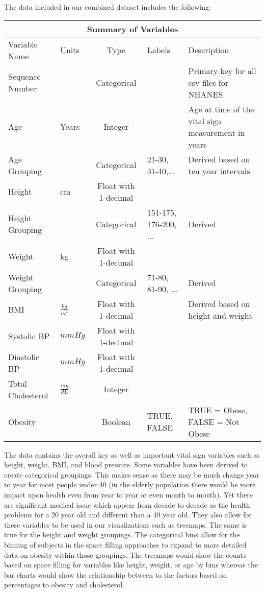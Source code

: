 \documentclass[12pt]{article}
\numberwithin{figure}{section}
\begin{document}
The data included in our combined dataset includes the following:
\begin{longtable}{|p{5cm}|p{1.4cm}|c|p{2cm}|p{6.5cm}|}
\hline
\multicolumn{5}{|c|}{Summary of Variables}\\
\hline
Variable Name&Units&Type&Labels&Description\\
\hline
Sequence Number &&Categorical& & Primary key for all csv files for NHANES\\
\hline
Age &Years&Integer& & Age at time of the vital sign measurement in years\\
\hline
Age Grouping&&Categorical&21-30, 31-40,... &Derived based on ten year intervals\\
\hline
Height&cm&Float with 1-decimal& & \\
\hline
Height Grouping&&Categorical&151-175, 176-200, ...& Derived\\
\hline
Weight&kg&Float with 1-decimal&  & \\
\hline
Weight Grouping&&Categorical&71-80, 81-90, ...& Derived\\
\hline
BMI&$\frac{kg}{m^2}$&Float with 1-decimal&  &Derived based on height and weight \\
\hline
Systolic BP&$mmHg$&Float with 1-decimal&  & \\
\hline
Diastolic BP&$mmHg$&Float with 1-decimal&  & \\
\hline
Total Cholesterol&$\frac{mg}{dL}$&Integer&  & \\
\hline
Obesity&&Boolean& TRUE, FALSE &TRUE = Obese, FALSE = Not Obese \\
\hline
\end{longtable}

The data contains the overall key as well as important vital sign variables such as height, weight, BMI, and blood pressure.  Some variables have been derived to create categorical groupings.  This makes sense as there may be much change year to year for most people under 40 (in the elderly population there would be more impact upon health even from year to year or even month to month).  Yet there are significant medical issue which appear from decade to decade as the health problems for a 20 year old and different than a 40 year old.  They also allow for these variables to be used in our visualizations such as treemaps.  The same is true for the height and weight groupings.  The categorical bins allow for the binning of subjects in the space filling approaches to expand to more detailed data on obesity within those groupings.  The treemaps would show the counts based on space filling for variables like height, weight, or age by bins whereas the bar charts would show the relationship between to the factors based on percentages to obesity and cholesterol. 
\end{document}
